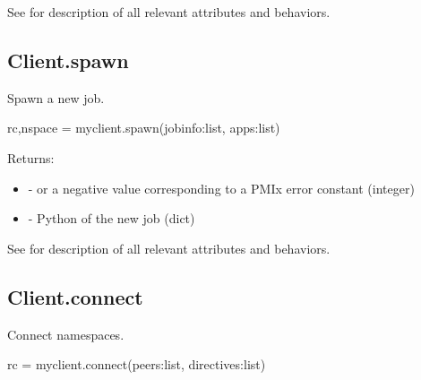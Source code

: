 See  for description of all relevant attributes and behaviors.


\subsection{Client.spawn}

\summary

Spawn a new job.

\format

\pyspecificstart
\begin{codepar}
rc,nspace = myclient.spawn(jobinfo:list, apps:list)
\end{codepar}
\pyspecificend

\begin{arglist}
\end{arglist}

Returns:

\begin{itemize}
    \item {} -  or a negative value corresponding to a PMIx error constant (integer)
    \item {} - Python  of the new job (dict)
\end{itemize}

See  for description of all relevant attributes and behaviors.


\subsection{Client.connect}

\summary

Connect namespaces.

\format

\pyspecificstart
\begin{codepar}
rc = myclient.connect(peers:list, directives:list)
\end{codepar}
\pyspecificend

\begin{arglist}
\end{arglist}

